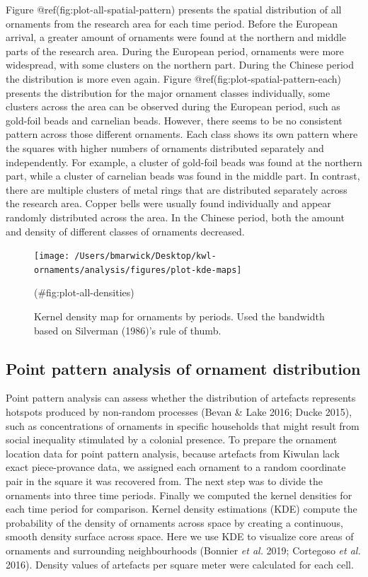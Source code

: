 \documentclass[]{article}
\begin{document}
Figure @ref(fig:plot-all-spatial-pattern) presents the spatial
distribution of all ornaments from the research area for each time
period. Before the European arrival, a greater amount of ornaments were
found at the northern and middle parts of the research area. During the
European period, ornaments were more widespread, with some clusters on
the northern part. During the Chinese period the distribution is more
even again. Figure @ref(fig:plot-spatial-pattern-each) presents the
distribution for the major ornament classes individually, some clusters
across the area can be observed during the European period, such as
gold-foil beads and carnelian beads. However, there seems to be no
consistent pattern across those different ornaments. Each class shows
its own pattern where the squares with higher numbers of ornaments
distributed separately and independently. For example, a cluster of
gold-foil beads was found at the northern part, while a cluster of
carnelian beads was found in the middle part. In contrast, there are
multiple clusters of metal rings that are distributed separately across
the research area. Copper bells were usually found individually and
appear randomly distributed across the area. In the Chinese period, both
the amount and density of different classes of ornaments decreased.

\begin{figure}
\texttt{[image: /Users/bmarwick/Desktop/kwl-ornaments/analysis/figures/plot-kde-maps]} \caption{Kernel density map for ornaments by periods. Used the bandwidth based on Silverman (1986)'s rule of thumb.}(\#fig:plot-all-densities)
\end{figure}

\hypertarget{point-pattern-analysis-of-ornament-distribution}{%
\subsection{Point pattern analysis of ornament
distribution}\label{point-pattern-analysis-of-ornament-distribution}}

Point pattern analysis can assess whether the distribution of artefacts
represents hotspots produced by non-random processes (Bevan \& Lake
2016; Ducke 2015), such as concentrations of ornaments in specific
households that might result from social inequality stimulated by a
colonial presence. To prepare the ornament location data for point
pattern analysis, because artefacts from Kiwulan lack exact
piece-provance data, we assigned each ornament to a random coordinate
pair in the square it was recovered from. The next step was to divide
the ornaments into three time periods. Finally we computed the kernel
densities for each time period for comparison. Kernel density
estimations (KDE) compute the probability of the density of ornaments
across space by creating a continuous, smooth density surface across
space. Here we use KDE to visualize core areas of ornaments and
surrounding neighbourhoods (Bonnier \emph{et al.} 2019; Cortegoso
\emph{et al.} 2016). Density values of artefacts per square meter were
calculated for each cell.
\end{document}
